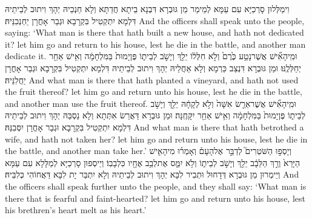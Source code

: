 {וִימַלְּלוּן סָרְכַיָּא עִם עַמָּא לְמֵימַר מַן גּוּבְרָא דִּבְנָא בֵיתָא חֲדַתָּא וְלָא חַנְכֵיהּ יְהָךְ וִיתוּב לְבֵיתֵיהּ דִּלְמָא יִתְקְטִיל בִּקְרָבָא וּגְבַר אָחֳרָן יַחְנְכִנֵּיהּ׃}
{And the officers shall speak unto the people, saying: ‘What man is there that hath built a new house, and hath not dedicated it? let him go and return to his house, lest he die in the battle, and another man dedicate it.}{}
{וּמִֽי\maqqaf הָאִ֞ישׁ אֲשֶׁר\maqqaf נָטַ֥ע כֶּ֙רֶם֙ וְלֹ֣א חִלְּל֔וֹ יֵלֵ֖ךְ וְיָשֹׁ֣ב לְבֵית֑וֹ פֶּן\maqqaf יָמוּת֙ בַּמִּלְחָמָ֔ה וְאִ֥ישׁ אַחֵ֖ר יְחַלְּלֶֽנּוּ׃}
{וּמַן גּוּבְרָא דִּנְצַב כַּרְמָא וְלָא אַחֲלֵיהּ יְהָךְ וִיתוּב לְבֵיתֵיהּ דִּלְמָא יִתְקְטִיל בִּקְרָבָא וּגְבַר אָחֳרָן יַחֲלִנֵּיהּ׃}
{And what man is there that hath planted a vineyard, and hath not used the fruit thereof? let him go and return unto his house, lest he die in the battle, and another man use the fruit thereof.}{}
{וּמִֽי\maqqaf הָאִ֞ישׁ אֲשֶׁר\maqqaf אֵרַ֤שׂ אִשָּׁה֙ וְלֹ֣א לְקָחָ֔הּ יֵלֵ֖ךְ וְיָשֹׁ֣ב לְבֵית֑וֹ פֶּן\maqqaf יָמוּת֙ בַּמִּלְחָמָ֔ה וְאִ֥ישׁ אַחֵ֖ר יִקָּחֶֽנָּה׃}
{וּמַן גּוּבְרָא דַּאֲרַשׂ אִתְּתָא וְלָא נַסְבַּהּ יְהָךְ וִיתוּב לְבֵיתֵיהּ דִּלְמָא יִתְקְטִיל בִּקְרָבָא וּגְבַר אָחֳרָן יִסְּבִנַּהּ׃}
{And what man is there that hath betrothed a wife, and hath not taken her? let him go and return unto his house, lest he die in the battle, and another man take her.’}{}
{וְיָסְפ֣וּ הַשֹּׁטְרִים֮ לְדַבֵּ֣ר אֶל\maqqaf הָעָם֒ וְאָמְר֗וּ מִי\maqqaf הָאִ֤ישׁ הַיָּרֵא֙ וְרַ֣ךְ הַלֵּבָ֔ב יֵלֵ֖ךְ וְיָשֹׁ֣ב לְבֵית֑וֹ וְלֹ֥א יִמַּ֛ס אֶת\maqqaf לְבַ֥ב אֶחָ֖יו כִּלְבָבֽוֹ׃}
{וְיֵיסְפוּן סָרְכַיָּא לְמַלָּלָא עִם עַמָּא וְיֵימְרוּן מַן גּוּבְרָא דְּדָחוּל וּתְבִיר לִבָּא יְהָךְ וִיתוּב לְבֵיתֵיהּ וְלָא יִתְבַּר יָת לִבָּא דַּאֲחוֹהִי כְּלִבֵּיהּ׃}
{And the officers shall speak further unto the people, and they shall say: ‘What man is there that is fearful and faint-hearted? let him go and return unto his house, lest his brethren’s heart melt as his heart.’}{}
